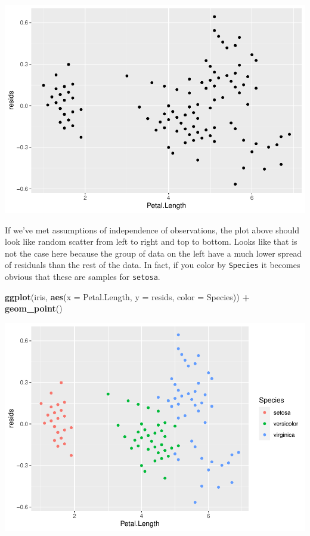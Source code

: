 \documentclass[
]{book}
\newenvironment{Shaded}{\begin{snugshade}}{\end{snugshade}}
\newcommand{\DataTypeTok}[1]{\textcolor[rgb]{0.13,0.29,0.53}{#1}}
\newcommand{\KeywordTok}[1]{\textcolor[rgb]{0.13,0.29,0.53}{\textbf{#1}}}
\newcommand{\NormalTok}[1]{#1}
\newcommand{\OperatorTok}[1]{\textcolor[rgb]{0.81,0.36,0.00}{\textbf{#1}}}
\newcommand{\StringTok}[1]{\textcolor[rgb]{0.31,0.60,0.02}{#1}}
\begin{document}
\includegraphics{worstr_files/figure-latex/unnamed-chunk-223-1.pdf}

If we've met assumptions of independence of observations, the plot above should look like random scatter from left to right and top to bottom. Looks like that is not the case here because the group of data on the left have a much lower spread of residuals than the rest of the data. In fact, if you color by \texttt{Species} it becomes obvious that these are samples for \texttt{setosa}.

\begin{Shaded}
\begin{Highlighting}[]
\KeywordTok{ggplot}\NormalTok{(iris, }\KeywordTok{aes}\NormalTok{(}\DataTypeTok{x =}\NormalTok{ Petal.Length, }\DataTypeTok{y =}\NormalTok{ resids, }\DataTypeTok{color =}\NormalTok{ Species)) }\OperatorTok{+}
\StringTok{  }\KeywordTok{geom_point}\NormalTok{() }
\end{Highlighting}
\end{Shaded}

\includegraphics{worstr_files/figure-latex/unnamed-chunk-224-1.pdf}
\end{document}
